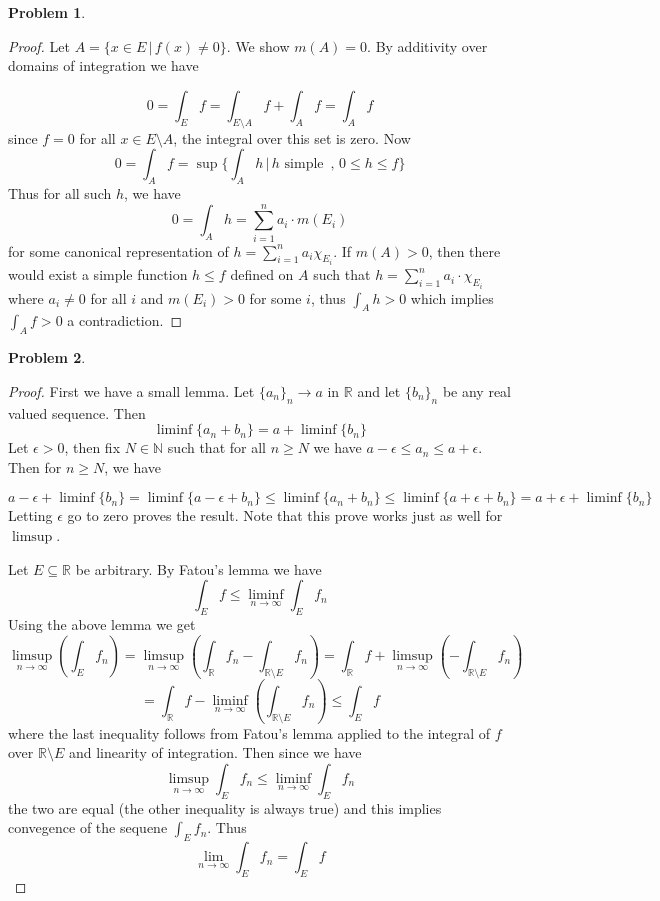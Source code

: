 \documentclass{article}
\newcommand{\R}{\mathbb{R}}
\newcommand{\N}{\mathbb{N}}
\newtheorem{prb}{Problem}
\begin{document}
	    \begin{prb}  \end{prb} 
	    \begin{proof} 
		    Let $A = \{ x \in E\, | \, f(x) \neq 0 \}$. We show $m(A) = 0$. By additivity over domains of integration we have 

		    \[  0 = \int_E f = \int_{E \setminus A } f + \int_A f = \int_A f \] 
		    since $f = 0$ for all $x \in E \setminus A$, the integral over this set is zero. 
		    Now 
		    \[ 0 = \int_A f = \sup\{ \int_A h \, |\, h \text{ simple } \, , \, 0 \leq h \leq f \} \] 
		    Thus for all such $h$, we have 
		    \[ 0 = \int_A h = \sum_{i = 1}^n a_i \cdot m(E_i) \]
		    for some canonical representation of $h = \sum_{i = 1}^n a_i \chi_{E_i}$. If $m(A) > 0$, 
		    then there would exist a simple function $h 
		    \leq f$ defined on $A$ such that 
		    $h = \sum_{i = 1}^n a_i \cdot \chi_{E_i}$ where $a_i \neq 0$ for all $i$ and  $m(E_i) > 0$ for some $i$, thus $\int_A h> 0$ which implies $\int_A f > 0$ a contradiction. 
	    \end{proof} 

	    \begin{prb}  \end{prb} 
	    \begin{proof} 
	      First we have a small lemma. Let $\{a_n\}_n \to a$ in $\R$ and let $\{b_n\}_n$ be any real valued sequence. 	Then 
	      \[ \liminf \{ a_n + b_n \} = a + \liminf\{b_n\} \] 
	      Let $\epsilon > 0$, then fix $N \in \N$ such that for all $n \geq N$ we have $a - \epsilon \leq a_n \leq a + \epsilon$. Then for $n \geq N$, we have  

	      \[ a - \epsilon + \liminf\{b_n\} =  \liminf\{a - \epsilon + b_n\} \leq \liminf\{ a_n + b_n\} \leq \liminf\{ a + \epsilon + b_n \} = a + \epsilon + \liminf\{b_n\} \]
Letting $\epsilon$ go to zero proves the result. Note that this prove works just as well for $\limsup$. 
	       
\medskip 

\noindent Let $E \subseteq \R$ be arbitrary. By Fatou's lemma we have 
\[\int_E f \leq \liminf_{n \to \infty} \int_E f_n \] 
Using the above lemma we get 
\[ \limsup_{n \to \infty} \left( \int_E f_n \right) = \limsup_{n \to \infty } \left( \int_\R f_n - \int_{\R \setminus E}f_n \right) = 
\int_\R f + \limsup_{n \to \infty} \left( - \int_{\R \setminus E} f_n \right)\] 
\[ = \int_\R f - \liminf_{n \to \infty } \left( \int_{\R \setminus E} f_n \right) \leq \int_E f \] 
where the last inequality follows from Fatou's lemma applied to the integral of $f$ over $\R \setminus E$ and linearity of integration.  
Then since we have 
\[ \limsup_{n \to \infty} \int_E f_n \leq \liminf_{n \to \infty} \int_E f_n  \] 
the two are equal (the other inequality is always true) and this implies convegence of the sequene $\int_E f_n$. 
Thus 
\[ \lim_{n \to \infty } \int_E f_n = \int_E f \] 

	    \end{proof} 
\end{document}
